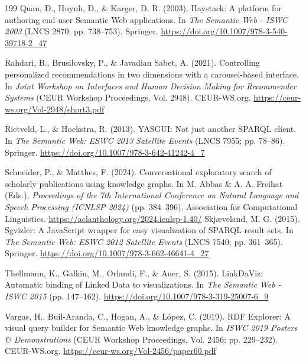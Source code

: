 \documentclass[manuscript,review,screen]{acmart}
\begin{document}
\begin{thebibliography}{199}
 Quan, D., Huynh, D., \& Karger, D. R. (2003). Haystack: A platform for authoring end user Semantic Web applications. In \textit{The Semantic Web - ISWC 2003} (LNCS 2870; pp. 738--753). Springer. \url{https://doi.org/10.1007/978-3-540-39718-2_47}

 Rahdari, B., Brusilovsky, P., \& Javadian Sabet, A. (2021). Controlling personalized recommendations in two dimensions with a carousel-based interface. In \textit{Joint Workshop on Interfaces and Human Decision Making for Recommender Systems} (CEUR Workshop Proceedings, Vol. 2948). CEUR-WS.org. \url{https://ceur-ws.org/Vol-2948/short3.pdf}

 Rietveld, L., \& Hoekstra, R. (2013). YASGUI: Not just another SPARQL client. In \textit{The Semantic Web: ESWC 2013 Satellite Events} (LNCS 7955; pp. 78--86). Springer. \url{https://doi.org/10.1007/978-3-642-41242-4_7}

 Schneider, P., \& Matthes, F. (2024). Conversational exploratory search of scholarly publications using knowledge graphs. In M. Abbas \& A. A. Freihat (Eds.), \textit{Proceedings of the 7th International Conference on Natural Language and Speech Processing (ICNLSP 2024)} (pp. 384--396). Association for Computational Linguistics. \url{https://aclanthology.org/2024.icnlsp-1.40/}
 Skj\ae{}veland, M. G. (2015). Sgvizler: A JavaScript wrapper for easy visualization of SPARQL result sets. In \textit{The Semantic Web: ESWC 2012 Satellite Events} (LNCS 7540; pp. 361--365). Springer. \url{https://doi.org/10.1007/978-3-662-46641-4_27}

 Thellmann, K., Galkin, M., Orlandi, F., \& Auer, S. (2015). LinkDaViz: Automatic binding of Linked Data to visualizations. In \textit{The Semantic Web - ISWC 2015} (pp. 147--162). \url{https://doi.org/10.1007/978-3-319-25007-6_9}

 Vargas, H., Buil-Aranda, C., Hogan, A., \& L\'{o}pez, C. (2019). RDF Explorer: A visual query builder for Semantic Web knowledge graphs. In \textit{ISWC 2019 Posters \& Demonstrations} (CEUR Workshop Proceedings, Vol. 2456; pp. 229--232). CEUR-WS.org. \url{https://ceur-ws.org/Vol-2456/paper60.pdf}


\end{thebibliography}
\end{document}
